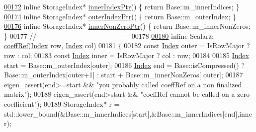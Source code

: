 \begin{DoxyCode}
\hyperlink{group___sparse_core___module_af5cd1f13dde8578eb9891a4ac4a11977}{00172}     \textcolor{keyword}{inline} StorageIndex* \hyperlink{group___sparse_core___module_af5cd1f13dde8578eb9891a4ac4a11977}{innerIndexPtr}()   \{ \textcolor{keywordflow}{return} Base::m\_innerIndices; \}
\hyperlink{group___sparse_core___module_a3b74af754254837fc591cd9936688b95}{00174}     \textcolor{keyword}{inline} StorageIndex* \hyperlink{group___sparse_core___module_a3b74af754254837fc591cd9936688b95}{outerIndexPtr}()   \{ \textcolor{keywordflow}{return} Base::m\_outerIndex; \}
\hyperlink{group___sparse_core___module_af877ea4e285a4497f80987fea66f7459}{00176}     \textcolor{keyword}{inline} StorageIndex* \hyperlink{group___sparse_core___module_af877ea4e285a4497f80987fea66f7459}{innerNonZeroPtr}() \{ \textcolor{keywordflow}{return} Base::m\_innerNonZeros; \}
00177     \textcolor{comment}{//----------------------------------------}
00178 
\hyperlink{group___sparse_core___module_aa9c42d48b9dd6f947ce3c257fe4bf2ca}{00180}     \textcolor{keyword}{inline} Scalar& \hyperlink{group___sparse_core___module_aa9c42d48b9dd6f947ce3c257fe4bf2ca}{coeffRef}(\hyperlink{group___core___module_a554f30542cc2316add4b1ea0a492ff02}{Index} row, \hyperlink{group___core___module_a554f30542cc2316add4b1ea0a492ff02}{Index} col)
00181     \{
00182       \textcolor{keyword}{const} \hyperlink{group___core___module_a554f30542cc2316add4b1ea0a492ff02}{Index} outer = IsRowMajor ? row : col;
00183       \textcolor{keyword}{const} \hyperlink{group___core___module_a554f30542cc2316add4b1ea0a492ff02}{Index} inner = IsRowMajor ? col : row;
00184 
00185       \hyperlink{group___core___module_a554f30542cc2316add4b1ea0a492ff02}{Index} start = Base::m\_outerIndex[outer];
00186       \hyperlink{group___core___module_a554f30542cc2316add4b1ea0a492ff02}{Index} end = Base::isCompressed() ? Base::m\_outerIndex[outer+1] : start + Base::m\_innerNonZeros[
      outer];
00187       eigen\_assert(end>=start && \textcolor{stringliteral}{"you probably called coeffRef on a non finalized matrix"});
00188       eigen\_assert(end>start && \textcolor{stringliteral}{"coeffRef cannot be called on a zero coefficient"});
00189       StorageIndex* r = std::lower\_bound(&Base::m\_innerIndices[start],&Base::m\_innerIndices[end],inner);

\end{DoxyCode}
